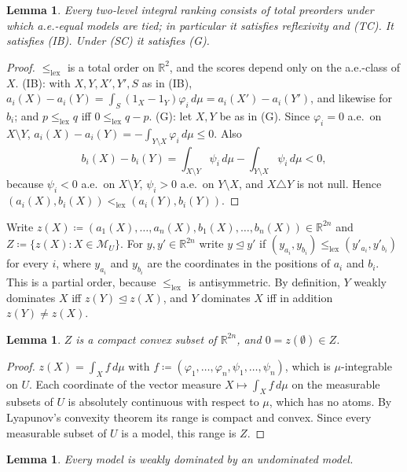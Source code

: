 \documentclass[11pt]{article}
\newcommand{\R}{\mathbb{R}}
\newcommand{\M}{\mathcal{M}}
\newcommand{\lexle}{\le_{\mathrm{lex}}}
\newcommand{\lexlt}{<_{\mathrm{lex}}}
\theoremstyle{plain}
\newtheorem{lemma}[theorem]{Lemma}
\theoremstyle{definition}
\theoremstyle{remark}
\begin{document}
\begin{lemma}\label{lem:axioms}
Every two-level integral ranking consists of total preorders under which a.e.-equal models
are tied; in particular it satisfies reflexivity and (TC). It satisfies (IB). Under (SC) it
satisfies (G).
\end{lemma}

\begin{proof}
$\lexle$ is a total order on $\R^2$, and the scores depend only on the a.e.-class of $X$.
(IB): with $X,Y,X',Y',S$ as in (IB), $a_i(X)-a_i(Y)=\int_S(1_X-1_Y)\varphi_i\,d\mu=
a_i(X')-a_i(Y')$, and likewise for $b_i$; and $p\lexle q$ iff $0\lexle q-p$. (G): let
$X,Y$ be as in (G). Since $\varphi_i=0$ a.e.\ on $X\setminus Y$, $a_i(X)-a_i(Y)=
-\int_{Y\setminus X}\varphi_i\,d\mu\le0$. Also
\[
  b_i(X)-b_i(Y)=\int_{X\setminus Y}\psi_i\,d\mu-\int_{Y\setminus X}\psi_i\,d\mu<0,
\]
because $\psi_i<0$ a.e.\ on $X\setminus Y$, $\psi_i>0$ a.e.\ on $Y\setminus X$, and
$X\triangle Y$ is not null. Hence $(a_i(X),b_i(X))\lexlt(a_i(Y),b_i(Y))$.
\end{proof}

Write $z(X)\coloneqq(a_1(X),\dots,a_n(X),b_1(X),\dots,b_n(X))\in\R^{2n}$ and
$Z\coloneqq\{z(X):X\in\M_U\}$. For $y,y'\in\R^{2n}$ write $y\trianglelefteq y'$ if
$(y_{a_i},y_{b_i})\lexle(y'_{a_i},y'_{b_i})$ for every $i$, where $y_{a_i}$ and $y_{b_i}$
are the coordinates in the positions of $a_i$ and $b_i$. This is a partial order, because
$\lexle$ is antisymmetric. By definition, $Y$ weakly dominates $X$ iff $z(Y)\trianglelefteq
z(X)$, and $Y$ dominates $X$ iff in addition $z(Y)\neq z(X)$.

\begin{lemma}\label{lem:lyap}
$Z$ is a compact convex subset of $\R^{2n}$, and $0=z(\emptyset)\in Z$.
\end{lemma}

\begin{proof}
$z(X)=\int_Xf\,d\mu$ with $f\coloneqq(\varphi_1,\dots,\varphi_n,\psi_1,\dots,\psi_n)$, which
is $\mu$-integrable on $U$. Each coordinate of the vector measure $X\mapsto\int_Xf\,d\mu$
on the measurable subsets of $U$ is absolutely continuous with respect to $\mu$, which has
no atoms. By Lyapunov's convexity theorem \cite{Lyapunov,Lindenstrauss} its range is
compact and convex. Since every measurable subset of $U$ is a model, this range is $Z$.
\end{proof}

\begin{lemma}\label{lem:zorn}
Every model is weakly dominated by an undominated model.
\end{lemma}
\end{document}
